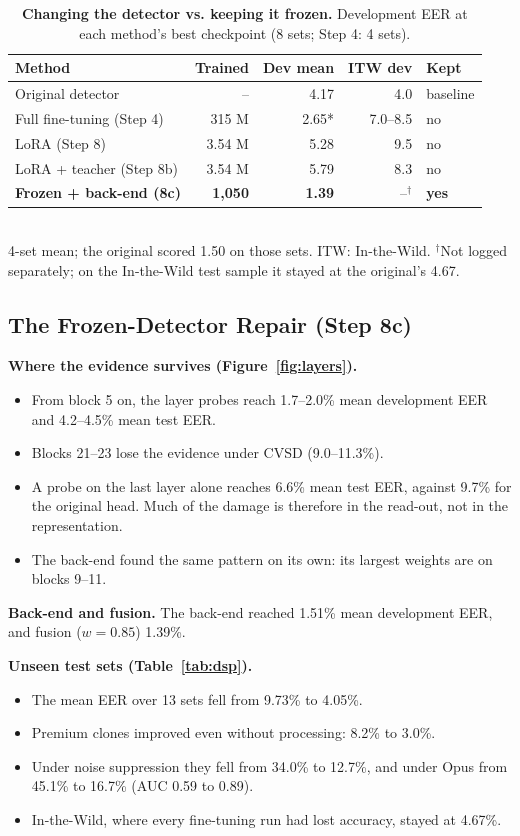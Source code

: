 \documentclass[10pt,a4paper,twocolumn]{article}
\begin{document}
\begin{table}[t]
\centering\scriptsize
\caption{\textbf{Changing the detector vs. keeping it frozen.} Development EER at each method's best checkpoint (8 sets; Step 4: 4 sets).}
\label{tab:ft}
\setlength{\tabcolsep}{3pt}
\begin{tabular}{@{}p{}rrrl@{}}
\toprule
\textbf{Method} & \textbf{Trained} & \textbf{Dev mean} & \textbf{ITW dev} & \textbf{Kept}\\
\midrule
Original detector & -- & 4.17 & 4.0 & baseline\\
Full fine-tuning (Step 4) & 315 M & 2.65* & 7.0--8.5 & no\\
LoRA (Step 8) & 3.54 M & 5.28 & 9.5 & no\\
LoRA + teacher (Step 8b) & 3.54 M & 5.79 & 8.3 & no\\
\textbf{Frozen + back-end (8c)} & \textbf{1,050} & \textbf{1.39} & --$^\dagger$ & \textbf{yes}\\
\bottomrule
\end{tabular}\\[1pt]
{\scriptsize *4-set mean; the original scored 1.50 on those sets. ITW: In-the-Wild. $^\dagger$Not logged separately; on the In-the-Wild test sample it stayed at the original's 4.67.}
\end{table}

\subsection{The Frozen-Detector Repair (Step 8c)}
\textbf{Where the evidence survives (Figure~\ref{fig:layers}).}
\begin{itemize}\setlength\itemsep{0pt}
\item From block 5 on, the layer probes reach 1.7--2.0\% mean development EER and 4.2--4.5\% mean test EER.
\item Blocks 21--23 lose the evidence under CVSD (9.0--11.3\%).
\item A probe on the last layer alone reaches 6.6\% mean test EER, against 9.7\% for the original head. Much of the damage is therefore in the read-out, not in the representation.
\item The back-end found the same pattern on its own: its largest weights are on blocks 9--11.
\end{itemize}

\textbf{Back-end and fusion.} The back-end reached 1.51\% mean development EER, and fusion ($w=0.85$) 1.39\%.

\textbf{Unseen test sets (Table~\ref{tab:dsp}).}
\begin{itemize}\setlength\itemsep{0pt}
\item The mean EER over 13 sets fell from 9.73\% to 4.05\%.
\item Premium clones improved even without processing: 8.2\% to 3.0\%.
\item Under noise suppression they fell from 34.0\% to 12.7\%, and under Opus from 45.1\% to 16.7\% (AUC 0.59 to 0.89).
\item In-the-Wild, where every fine-tuning run had lost accuracy, stayed at 4.67\%.
\end{itemize}
\end{document}

